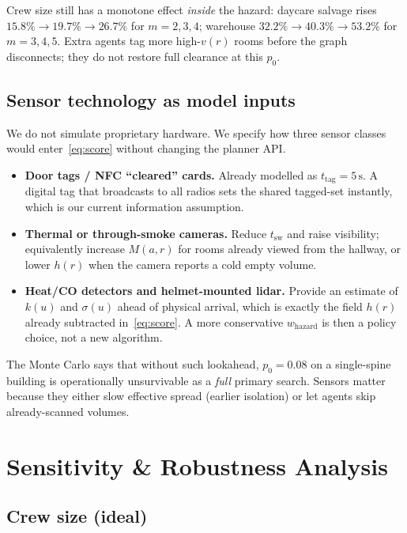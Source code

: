 \documentclass[12pt]{article}
\newcommand{\tsw}{t_{\mathrm{sw}}}
\newcommand{\ttag}{t_{\mathrm{tag}}}
\begin{document}
Crew size still has a monotone effect \emph{inside} the hazard: daycare salvage
rises \(15.8\%\to 19.7\%\to 26.7\%\) for \(m=2,3,4\); warehouse
\(32.2\%\to 40.3\%\to 53.2\%\) for \(m=3,4,5\). Extra agents tag more high-\(v(r)\)
rooms before the graph disconnects; they do not restore full clearance at this
\(p_0\).

\subsection{Sensor technology as model inputs}

We do not simulate proprietary hardware. We specify how three sensor classes would
enter~\eqref{eq:score} without changing the planner API.
\begin{itemize}[leftmargin=1.2em]
  \item \textbf{Door tags / NFC ``cleared'' cards.}
        Already modelled as \(\ttag=5\,\mathrm{s}\). A digital tag that broadcasts
        to all radios sets the shared tagged-set instantly, which is our current
        information assumption.
  \item \textbf{Thermal or through-smoke cameras.}
        Reduce \(\tsw\) and raise visibility; equivalently increase \(M(a,r)\) for
        rooms already viewed from the hallway, or lower \(h(r)\) when the camera
        reports a cold empty volume.
  \item \textbf{Heat/CO detectors and helmet-mounted lidar.}
        Provide an estimate of \(k(u)\) and \(\sigma(u)\) ahead of physical arrival,
        which is exactly the field \(h(r)\) already subtracted in~\eqref{eq:score}.
        A more conservative \(w_{\mathrm{hazard}}\) is then a policy choice, not a
        new algorithm.
\end{itemize}
The Monte Carlo says that without such lookahead, \(p_0=0.08\) on a single-spine
building is operationally unsurvivable as a \emph{full} primary search. Sensors
matter because they either slow effective spread (earlier isolation) or let agents
skip already-scanned volumes.

\section{Sensitivity \& Robustness Analysis}
\label{sec:req5}

\subsection{Crew size (ideal)}
\end{document}
